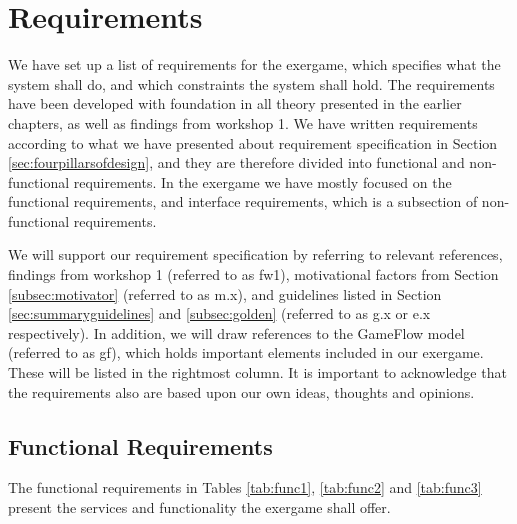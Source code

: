 \section{Requirements}
\label{sec:req}
We have set up a list of requirements for the exergame, which specifies what the system shall do, and which constraints the system shall hold. The requirements have been developed with foundation in all theory presented in the earlier chapters, as well as findings from workshop 1. We have written requirements according to what we have presented about requirement specification in Section \ref{sec:fourpillarsofdesign}, and they are therefore divided into functional and non-functional requirements. In the exergame we have mostly focused on the functional requirements, and interface requirements, which is a subsection of non-functional requirements. 

We will support our requirement specification by referring to relevant references, findings from workshop 1 (referred to as fw1), motivational factors from Section \ref{subsec:motivator} (referred to as m.x), and guidelines listed in Section \ref{sec:summaryguidelines} and \ref{subsec:golden} (referred to as g.x or e.x respectively). In addition, we will draw references to the GameFlow model \cite{sweetser} (referred to as gf), which holds important elements included in our exergame. These will be listed in the rightmost column. It is important to acknowledge that the requirements also are based upon our own ideas, thoughts and opinions. 

\subsection{Functional Requirements}
The functional requirements in Tables \ref{tab:func1}, \ref{tab:func2} and \ref{tab:func3} present the services and functionality the exergame shall offer.

